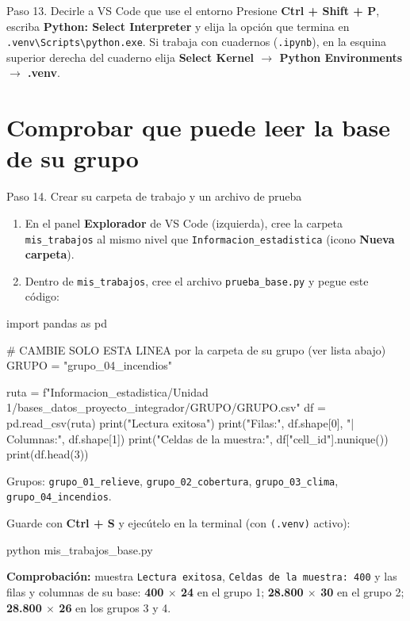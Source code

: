 \documentclass[11pt,a4paper]{article}
\newenvironment{terminal}{\begin{tcolorbox}[terminal]}{\end{tcolorbox}}
\begin{document}
\begin{paso}{Paso 13. Decirle a VS Code que use el entorno}
Presione \textbf{Ctrl + Shift + P}, escriba \textbf{Python: Select Interpreter} y elija la opción que termina en \texttt{.venv\textbackslash Scripts\textbackslash python.exe}. Si trabaja con cuadernos (\texttt{.ipynb}), en la esquina superior derecha del cuaderno elija \textbf{Select Kernel $\rightarrow$ Python Environments $\rightarrow$ .venv}.
\end{paso}

\clearpage
\section{Comprobar que puede leer la base de su grupo}

\begin{paso}{Paso 14. Crear su carpeta de trabajo y un archivo de prueba}
\begin{enumerate}[leftmargin=*]
  \item En el panel \textbf{Explorador} de VS Code (izquierda), cree la carpeta \texttt{mis\_trabajos} al mismo nivel que \texttt{Informacion\_estadistica} (icono \textbf{Nueva carpeta}).
  \item Dentro de \texttt{mis\_trabajos}, cree el archivo \texttt{prueba\_base.py} y pegue este código:
\end{enumerate}
\begin{terminal}
\begin{comando}
import pandas as pd

# CAMBIE SOLO ESTA LINEA por la carpeta de su grupo (ver lista abajo)
GRUPO = "grupo_04_incendios"

ruta = f"Informacion_estadistica/Unidad 1/bases_datos_proyecto_integrador/{GRUPO}/{GRUPO}.csv"
df = pd.read_csv(ruta)
print("Lectura exitosa")
print("Filas:", df.shape[0], "| Columnas:", df.shape[1])
print("Celdas de la muestra:", df["cell_id"].nunique())
print(df.head(3))
\end{comando}
\end{terminal}
Grupos: \texttt{grupo\_01\_relieve}, \texttt{grupo\_02\_cobertura}, \texttt{grupo\_03\_clima}, \texttt{grupo\_04\_incendios}.

Guarde con \textbf{Ctrl + S} y ejecútelo en la terminal (con \texttt{(.venv)} activo):
\begin{terminal}
\begin{comando}
python mis_trabajos\prueba_base.py
\end{comando}
\end{terminal}
\textbf{Comprobación:} muestra \texttt{Lectura exitosa}, \texttt{Celdas de la muestra: 400} y las filas y columnas de su base: \textbf{400 $\times$ 24} en el grupo 1; \textbf{28.800 $\times$ 30} en el grupo 2; \textbf{28.800 $\times$ 26} en los grupos 3 y 4.
\end{paso}
\end{document}

